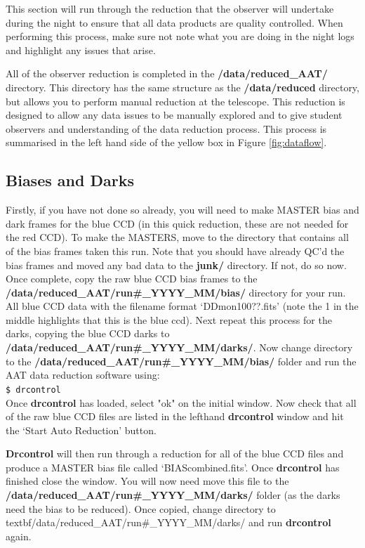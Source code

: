 \documentclass[12pt]{article}
\begin{document}
This section will run through the reduction that the observer will undertake during the night to ensure that all data products are quality controlled. When performing this process, make sure not note what you are doing in the night logs and highlight any issues that arise.

All of the observer reduction is completed in the \textbf{/data/reduced\_AAT/} directory. This directory has the same structure as the \textbf{/data/reduced} directory, but allows you to perform manual reduction at the telescope. This reduction is designed to allow any data issues to be manually explored and to give student observers and understanding of the data reduction process. This process is summarised in the left hand side of the yellow box in Figure \ref{fig:dataflow}.   

\subsection{Biases and Darks}

Firstly, if you have not done so already,  you will need to make MASTER bias and dark frames for the blue CCD (in this quick reduction, these are not needed for the red CCD). To make the MASTERS, move to the directory that contains all of the bias frames taken this run. Note that you should have already QC'd the bias frames and moved any bad data to the \textbf{junk/} directory.  If not, do so now. Once complete, copy the raw blue CCD bias frames to the \textbf{/data/reduced\_AAT/run\#\_YYYY\_MM/bias/} directory for your run. All blue CCD data with the filename format `DDmon100??.fits' (note the 1 in the middle highlights that this is the blue ccd). Next repeat this process for the darks, copying the blue CCD darks to \textbf{/data/reduced\_AAT/run\#\_YYYY\_MM/darks/}. Now change directory to the \textbf{/data/reduced\_AAT/run\#\_YYYY\_MM/bias/} folder and run the AAT data reduction software using: \\

\texttt{\$ drcontrol} \\

Once \textbf{drcontrol} has loaded, select "ok" on the initial window. Now check that all of the raw blue CCD files are listed in the lefthand \textbf{drcontrol} window and hit the `Start Auto Reduction' button. 

\textbf{Drcontrol} will then run through a reduction for all of the blue CCD files and produce a MASTER bias file called `BIAScombined.fits'. Once \textbf{drcontrol} has finished close the window. You will now need move this file to the \textbf{/data/reduced\_AAT/run\#\_YYYY\_MM/darks/} folder (as the darks need the bias to be reduced). Once copied,  change directory to textbf{/data/reduced\_AAT/run\#\_YYYY\_MM/darks/} and run \textbf{drcontrol} again.
\end{document}
